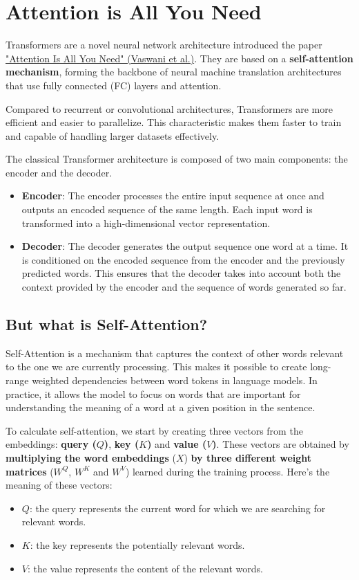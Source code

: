 \section{Attention is All You Need}

Transformers are a novel neural network architecture introduced the paper \href{https://arxiv.org/pdf/1706.03762}{"Attention Is All You Need" (Vaswani et al.)}. They are based on a \textbf{self-attention mechanism}, forming the backbone of neural machine translation architectures that use fully connected (FC) layers and attention.

Compared to recurrent or convolutional architectures, Transformers are more efficient and easier to parallelize. This characteristic makes them faster to train and capable of handling larger datasets effectively.

The classical Transformer architecture is composed of two main components: the encoder and the decoder.
\begin{itemize}
    \item \textbf{Encoder}: The encoder processes the entire input sequence at once and outputs an encoded sequence of the same length. Each input word is transformed into a high-dimensional vector representation.
    
    \item \textbf{Decoder}: The decoder generates the output sequence one word at a time. It is conditioned on the encoded sequence from the encoder and the previously predicted words. This ensures that the decoder takes into account both the context provided by the encoder and the sequence of words generated so far.
\end{itemize}


\subsection{But what is Self-Attention?}

Self-Attention is a mechanism that captures the context of other words relevant to the one we are currently processing. This makes it possible to create long-range weighted dependencies between word tokens in language models. In practice, it allows the model to focus on words that are important for understanding the meaning of a word at a given position in the sentence.

To calculate self-attention, we start by creating three vectors from the embeddings: \textbf{query ($Q$)}, \textbf{key ($K$)} and \textbf{value ($V$)}. These vectors are obtained by \textbf{multiplying the word embeddings} ($X$) \textbf{by three different weight matrices} ($W^Q$, $W^K$ and $W^V$) learned during the training process. Here's the meaning of these vectors:
\begin{itemize}
    \item $Q$: the query represents the current word for which we are searching for relevant words.
    \item $K$: the key represents the potentially relevant words.
    \item $V$: the value represents the content of the relevant words.
\end{itemize}


